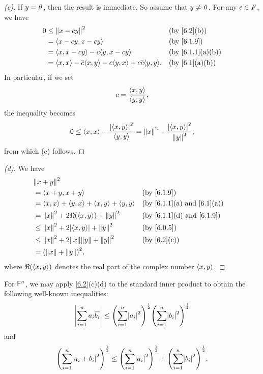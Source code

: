 \begin{proof}[(c)]
  If \(y = \mathit{0}\), then the result is immediate.
  So assume that \(y \neq \mathit{0}\).
  For any \(c \in \mathit{F}\), we have
  \begin{align*}
    0 & \leq \norm{x - cy}^2                                                       &  & \by{6.2}[b]     \\
      & = \inn{x - cy, x - cy}                                                     &  & \by{6.1.9}      \\
      & = \inn{x, x - cy} - c \inn{y, x - cy}                                      &  & \by{6.1.1}[a,b] \\
      & = \inn{x, x} - \conj{c} \inn{x, y} - c \inn{y, x} + c \conj{c} \inn{y, y}. &  & \by{6.1}[a,b]
  \end{align*}
  In particular, if we set
  \[
    c = \frac{\left\langle x, y\right\rangle}{\left\langle y, y\right\rangle},
  \]
  the inequality becomes
  \[
    0 \leq \left\langle x, x\right\rangle - \frac{\left\lvert\left\langle x, y\right\rangle\right\rvert^2}{\left\langle y, y\right\rangle} = \left\lVert x\right\rVert^2 - \frac{\left\lvert\left\langle x, y\right\rangle\right\rvert^2}{\left\lVert y\right\rVert^2},
  \]
  from which (c) follows.
\end{proof}

\begin{proof}[(d)]
  We have
  \begin{align*}
     & \norm{x + y}^2                                                                                         \\
     & = \inn{x + y, x + y}                                &  & \by{6.1.9}                                    \\
     & = \inn{x, x} + \inn{y, x} + \inn{x, y} + \inn{y, y} &  & \text{(by \cref{6.1.1}(a) and \cref{6.1}(a))} \\
     & = \norm{x}^2 + 2 \Re(\inn{x, y}) + \norm{y}^2       &  & \text{(by \cref{6.1.1}(d) and \cref{6.1.9})}  \\
     & \leq \norm{x}^2 + 2 \abs{\inn{x, y}} + \norm{y}^2   &  & \by{d.0.5}                                    \\
     & \leq \norm{x}^2 + 2 \norm{x} \norm{y} + \norm{y}^2  &  & \by{6.2}[c]                                   \\
     & = \pa{\norm{x} + \norm{y}}^2,
  \end{align*}
  where \(\Re(\left\langle x, y\right\rangle)\) denotes the real part of the complex number \(\left\langle x, y\right\rangle\).
\end{proof}

\begin{eg}\label{6.1.11}
  For \(\mathsf{F}^n\), we may apply \cref{6.2}(c)(d) to the standard inner product to obtain the following well-known inequalities:
  \[
    \abs{\sum_{i = 1}^n a_i \conj{b_i}} \leq \pa{\sum_{i = 1}^n \abs{a_i}^2}^{\frac{1}{2}} \pa{\sum_{i = 1}^n \abs{b_i}^2}^{\frac{1}{2}}
  \]
  and
  \[
    \pa{\sum_{i = 1}^n \abs{a_i + b_i}^2}^{\frac{1}{2}} \leq \pa{\sum_{i = 1}^n \abs{a_i}^2}^{\frac{1}{2}} + \pa{\sum_{i = 1}^n \abs{b_i}^2}^{\frac{1}{2}}.
  \]
\end{eg}


